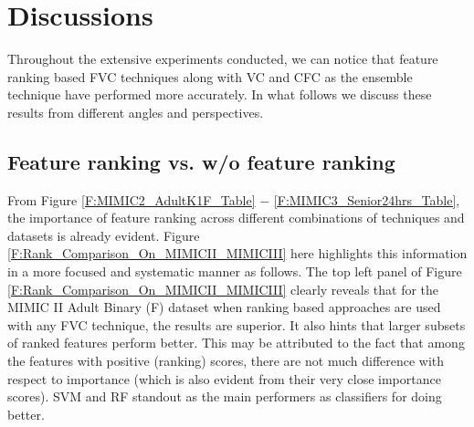 \section{Discussions} \label{s:discussions}
Throughout the extensive experiments conducted, we can notice that feature ranking based FVC techniques along with VC and CFC as the ensemble  technique have performed more accurately. In what follows we discuss these results from different angles and perspectives. 

\subsection{Feature ranking vs. w/o feature ranking}
From Figure \ref{F:MIMIC2_AdultK1F_Table} $-$ \ref{F:MIMIC3_Senior24hrs_Table}, the importance of feature ranking across different combinations of techniques and datasets is already evident. Figure \ref{F:Rank_Comparison_On_MIMICII_MIMICIII} here highlights this information in a more focused and systematic manner as follows.
The top left panel of Figure \ref{F:Rank_Comparison_On_MIMICII_MIMICIII} clearly reveals that for the MIMIC II Adult Binary (F) dataset when ranking based approaches are used with any FVC technique, the results are superior. It also hints that larger subsets of ranked features perform better. This may be attributed to the fact that among the features with positive (ranking) scores, there are not much difference with respect to importance (which is also evident from their very close importance scores). SVM and RF standout as the main performers as classifiers for doing better. 

